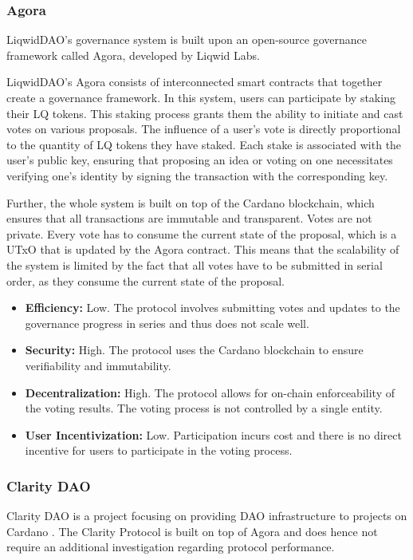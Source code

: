 \documentclass[11pt]{article}
\begin{document}
\subsubsection{Agora}
LiqwidDAO's governance system is built upon an open-source governance framework called Agora\cite{liqwidagora}, developed by Liqwid Labs.

LiqwidDAO's Agora consists of interconnected smart contracts that together create a governance framework.
In this system, users can participate by staking their LQ tokens.
This staking process grants them the ability to initiate and cast votes on various proposals.
The influence of a user's vote is directly proportional to the quantity of LQ tokens they have staked.
Each stake is associated with the user's public key, ensuring that proposing an idea or voting on one necessitates verifying one's identity by signing the transaction with the corresponding key.

Further, the whole system is built on top of the Cardano blockchain, which ensures that all transactions are immutable and transparent.
Votes are not private.
Every vote has to consume the current state of the proposal, which is a UTxO that is updated by the Agora contract.
This means that the scalability of the system is limited by the fact that all votes have to be submitted in serial order, as they consume the current state of the proposal.

\begin{itemize}
    \item \textbf{Efficiency:} Low. The protocol involves submitting votes and updates to the governance progress in series and thus does not scale well.
    \item \textbf{Security:} High. The protocol uses the Cardano blockchain to ensure verifiability and immutability.
    \item \textbf{Decentralization:} High. The protocol allows for on-chain enforceability of the voting results. The voting process is not controlled by a single entity.
    \item \textbf{User Incentivization:} Low. Participation incurs cost and there is no direct incentive for users to participate in the voting process.
\end{itemize}

\subsubsection{Clarity DAO}

Clarity DAO is a project focusing on providing DAO infrastructure to projects on Cardano \cite{panchot2023clarity}.
The Clarity Protocol is built on top of Agora and does hence not require an additional investigation regarding protocol performance.
\end{document}
